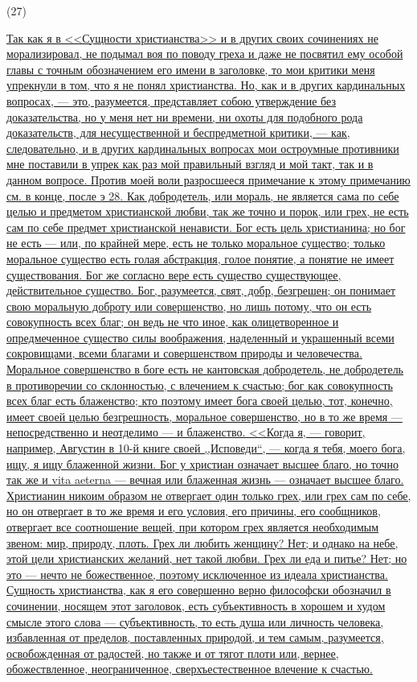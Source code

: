 \documentclass[12pt]{article}
\begin{document}
\hypertarget{27}{(27)} \hyperlink{b27}{Так как я в <<Сущности христианства>> и в других своих сочинениях не морализировал, не подымал воя по поводу греха и даже не посвятил ему особой главы с точным обозначением его имени в заголовке, то мои критики меня упрекнули в том, что я не понял христианства. Но, как и в других кардинальных вопросах, --- это, разумеется, представляет собою утверждение без доказательства, но у меня нет ни времени, ни охоты для подобного рода доказательств, для несущественной и беспредметной критики, --- как, следовательно, и в других кардинальных вопросах мои остроумные противники мне поставили в упрек как раз мой правильный взгляд и мой такт, так и в данном вопросе. Против моей воли разросшееся примечание к этому примечанию см. в конце, после э 28. Как добродетель, или мораль, не является сама по себе целью и предметом христианской любви, так же точно и порок, или грех, не есть сам по себе предмет христианской ненависти. Бог есть цель христианина; но бог не есть --- или, по крайней мере, есть не только моральное существо; только моральное существо есть голая абстракция, голое понятие, а понятие не имеет существования. Бог же согласно вере есть существо существующее, действительное существо. Бог, разумеется, свят, добр, безгрешен; он понимает свою моральную доброту или совершенство, но лишь потому, что он есть совокупность всех благ; он ведь не что иное, как олицетворенное и опредмеченное существо силы воображения, наделенный и украшенный всеми сокровищами, всеми благами и совершенством природы и человечества. Моральное совершенство в боге есть не кантовская добродетель, не добродетель в противоречии со склонностью, с влечением к счастью; бог как совокупность всех благ есть блаженство; кто поэтому имеет бога своей целью, тот, конечно, имеет своей целью безгрешность, моральное совершенство, но в то же время --- непосредственно и неотделимо --- и блаженство. <<Когда я, --- говорит, например, Августин в 10-й книге своей ,,Исповеди``, --- когда я тебя, моего бога, ищу, я ищу блаженной жизни. Бог у христиан означает высшее благо, но точно так же и vita aeterna --- вечная или блаженная жизнь --- означает высшее благо. Христианин никоим образом не отвергает один только грех, или грех сам по себе, но он отвергает в то же время и его условия, его причины, его сообщников, отвергает все соотношение вещей, при котором грех является необходимым звеном: мир, природу, плоть. Грех ли любить женщину? Нет; и однако на небе, этой цели христианских желаний, нет такой любви. Грех ли еда и питье? Нет; но это --- нечто не божественное, поэтому исключенное из идеала христианства. Сущность христианства, как я его совершенно верно философски обозначил в сочинении, носящем этот заголовок, есть субъективность в хорошем и худом смысле этого слова --- субъективность, то есть душа или личность человека, избавленная от пределов, поставленных природой, и тем самым, разумеется, освобожденная от радостей, но также и от тягот плоти или, вернее, обожествленное, неограниченное, сверхъестественное влечение к счастью.}
\end{document}
